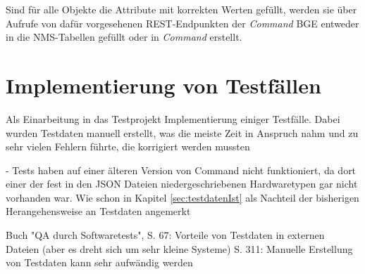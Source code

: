 Sind für alle Objekte die Attribute mit korrekten Werten gefüllt, werden sie über Aufrufe von dafür vorgesehenen \ac{REST}-Endpunkten der \textit{Command} \ac{BGE} entweder in die \ac{NMS}-Tabellen gefüllt oder in \textit{Command} erstellt.

\section{Implementierung von Testfällen}\label{sec:testimplementierung}
Als Einarbeitung in das Testprojekt Implementierung einiger Testfälle. Dabei wurden Testdaten manuell erstellt, was die meiste Zeit in Anspruch nahm und zu sehr vielen Fehlern führte, die korrigiert werden mussten

- Tests haben auf einer älteren Version von Command nicht funktioniert, da dort einer der fest in den \ac{JSON} Dateien niedergeschriebenen Hardwaretypen gar nicht vorhanden war. Wie schon in Kapitel \ref{sec:testdatenIst} als Nachteil der bisherigen Herangehensweise an Testdaten angemerkt

Buch "QA durch Softwaretests", S. 67: Vorteile von Testdaten in externen Dateien (aber es dreht sich um sehr kleine Systeme)
S. 311: Manuelle Erstellung von Testdaten kann sehr aufwändig werden